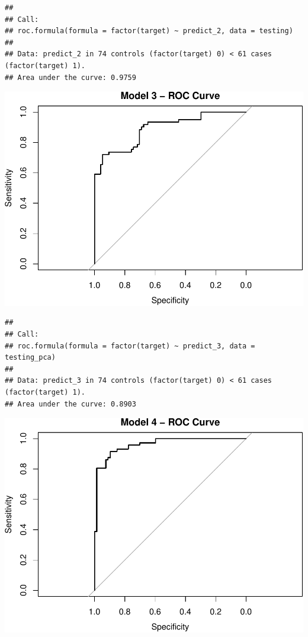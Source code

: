 \documentclass[]{article}
\begin{document}
\begin{verbatim}
## 
## Call:
## roc.formula(formula = factor(target) ~ predict_2, data = testing)
## 
## Data: predict_2 in 74 controls (factor(target) 0) < 61 cases (factor(target) 1).
## Area under the curve: 0.9759
\end{verbatim}

\includegraphics{HW3_Final_files/figure-latex/unnamed-chunk-19-3.pdf}

\begin{verbatim}
## 
## Call:
## roc.formula(formula = factor(target) ~ predict_3, data = testing_pca)
## 
## Data: predict_3 in 74 controls (factor(target) 0) < 61 cases (factor(target) 1).
## Area under the curve: 0.8903
\end{verbatim}

\includegraphics{HW3_Final_files/figure-latex/unnamed-chunk-19-4.pdf}
\end{document}
